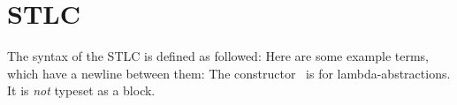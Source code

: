 \documentclass{article}
\begin{document}
  \section{STLC}
  The syntax of the STLC is defined as followed:
  \STLCSyntax
  Here are some example terms, which have a newline between them:
  \STLCExamples
  The constructor \STLCEAbs\ is for lambda-abstractions. It is \emph{not} typeset as a block.
\end{document}
